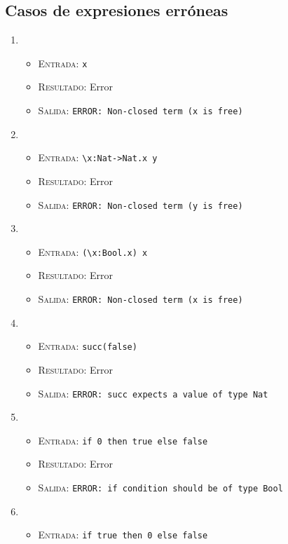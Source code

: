 \documentclass[11pt]{article}
\newcounter{savedenum}
\newcommand{\loadenum}{\setcounter{enumi}{\thesavedenum}}
\begin{document}
\subsection{Casos de expresiones erróneas}
\begin{enumerate}
\loadenum
\item \begin{itemize}\item \textsc{Entrada:} \verb|x|
    \item \textsc{Resultado:} Error
    \item \textsc{Salida:} \verb|ERROR: Non-closed term (x is free)|
    \end{itemize}
\item \begin{itemize}
    \item \textsc{Entrada:} \verb|\x:Nat->Nat.x y|
    \item \textsc{Resultado:} Error
    \item \textsc{Salida:} \verb|ERROR: Non-closed term (y is free)|
    \end{itemize}
\item \begin{itemize}
    \item \textsc{Entrada:} \verb|(\x:Bool.x) x|
    \item \textsc{Resultado:} Error
    \item \textsc{Salida:} \verb|ERROR: Non-closed term (x is free)|
    \end{itemize}
\item \begin{itemize}
    \item \textsc{Entrada:} \verb|succ(false)|
    \item \textsc{Resultado:} Error
    \item \textsc{Salida:} \verb|ERROR: succ expects a value of type Nat|
    \end{itemize}
\item \begin{itemize}
    \item \textsc{Entrada:} \verb|if 0 then true else false|
    \item \textsc{Resultado:} Error
    \item \textsc{Salida:} \verb|ERROR: if condition should be of type Bool|
    \end{itemize}
\item \begin{itemize}
    \item \textsc{Entrada:} \verb|if true then 0 else false|

\end{itemize}
\end{enumerate}
\end{document}
